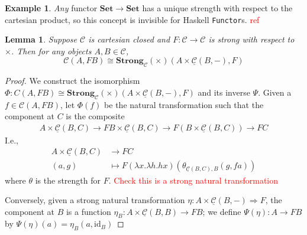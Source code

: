 \documentclass[11pt,a4paper]{article}
\theoremstyle{plain}
\newtheorem{lemma}[theorem]{Lemma}
\theoremstyle{definition}
\newtheorem{example}[theorem]{Example}
\newcommand{\C}{\mathscr{C}}
\newcommand{\homC}{\underline{\C}}
\newcommand{\Set}{\mathbf{Set}}
\newcommand{\Strong}{\mathbf{Strong}}
\newcommand{\id}{\mathrm{id}}
\newcommand{\const}{\mathrm{const}}
\newcommand{\todo}[1]{\textcolor{red}{\small #1}}
\begin{document}
\begin{example}
  \emph{Any} functor $\Set \to \Set$ has a unique strength with respect to the cartesian product, so this concept is invisible for Haskell \texttt{Functor}s. \todo{ref}
\end{example}

\begin{lemma}
  Suppose $\C$ is cartesian closed and $F : \C \to \C$ is strong with respect to $\times$. Then for any objects $A, B \in \C$, \[\C(A, FB) \cong \Strong_\C(\times)(A \times \homC(B, -), F)\]
\end{lemma}
\begin{proof}
  We construct the isomorphism $\Phi: C(A, FB) \cong \Strong_\C(\times)(A \times \homC(B, -), F)$ and its inverse $\Psi$.
  Given a $f \in \C(A, FB)$, let $\Phi(f)$ be the natural transformation such that the component at $C$ is the composite
  \begin{align*}
    A \times \homC(B, C) \to FB \times \homC(B, C) \to F(B \times \homC(B, C)) \to FC
  \end{align*}
  I.e.,
  \begin{align*}
    A \times \homC(B, C) &\to FC \\
    (a, g) &\mapsto F(\lambda x. \lambda h. h x)(\theta_{\homC(B, C), B}(g, f a))
  \end{align*}
  where $\theta$ is the strength for $F$.
  \todo{Check this is a strong natural transformation}

  Conversely, given a strong natural transformation $\eta : A \times \homC(B, -) \Rightarrow F$, the component at $B$ is a function $\eta_B : A \times \homC(B, B) \to FB$; we define $\Psi(\eta) : A \to FB$ by $\Psi(\eta)(a) = \eta_B(a, \id_B)$



\end{proof}
\end{document}
